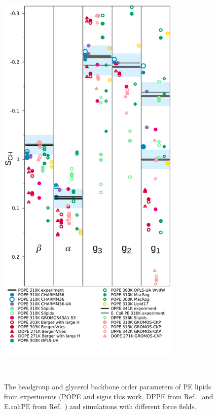 \documentclass[journal=jpcbfk]{achemso}
\begin{document}
\begin{figure}[]
  \centering
  \includegraphics[width=9.0cm]{./Figs/HGorderparametersPE.pdf}
  \caption{\label{HGorderParametersPE}
    The headgroup and glycerol backbone order parameters of PE lipids
    from experiments (POPE and signs this work, DPPE from Ref.~
    and E.coliPE from Ref.~) and simulations with different force fields.
  }
   \\
\end{figure}
\end{document}
